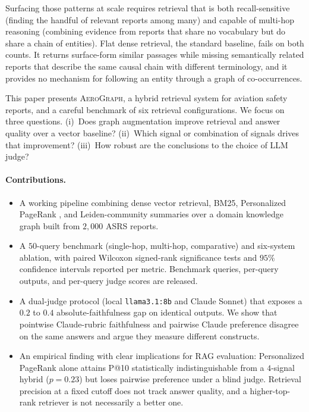 \documentclass[10pt,a4paper]{article}
\begin{document}
Surfacing those patterns at scale requires retrieval that is both
recall-sensitive (finding the handful of relevant reports among many)
and capable of multi-hop reasoning (combining evidence from reports
that share no vocabulary but do share a chain of entities). Flat dense
retrieval, the standard baseline, fails on both counts. It returns
surface-form similar passages while missing semantically related
reports that describe the same causal chain with different
terminology, and it provides no mechanism for following an entity
through a graph of co-occurrences.

This paper presents \textsc{AeroGraph}, a hybrid retrieval system for
aviation safety reports, and a careful benchmark of six retrieval
configurations. We focus on three questions. (i)~Does graph
augmentation improve retrieval and answer quality over a vector
baseline? (ii)~Which signal or combination of signals drives that
improvement? (iii)~How robust are the conclusions to the choice of
LLM judge?

\paragraph{Contributions.}
\begin{itemize}[leftmargin=1.2em,itemsep=1pt,topsep=2pt]
\item A working pipeline combining dense vector retrieval, BM25,
Personalized PageRank \citep{gutierrez2024hipporag}, and
Leiden-community summaries \citep{edge2024graphrag,traag2019leiden}
over a domain knowledge graph built from $2{,}000$ ASRS reports.
\item A $50$-query benchmark (single-hop, multi-hop, comparative) and
six-system ablation, with paired Wilcoxon signed-rank significance
tests and $95\%$ confidence intervals reported per metric. Benchmark
queries, per-query outputs, and per-query judge scores are released.
\item A dual-judge protocol (local \texttt{llama3.1:8b} and Claude
Sonnet) that exposes a $0.2$ to $0.4$ absolute-faithfulness gap on
identical outputs. We show that pointwise Claude-rubric faithfulness
and pairwise Claude preference disagree on the same answers and argue
they measure different constructs.
\item An empirical finding with clear implications for RAG
evaluation: Personalized PageRank alone attains P@10 statistically
indistinguishable from a $4$-signal hybrid ($p = 0.23$) but loses
pairwise preference under a blind judge. Retrieval precision at a
fixed cutoff does not track answer quality, and a higher-top-rank
retriever is not necessarily a better one.
\end{itemize}
\end{document}
